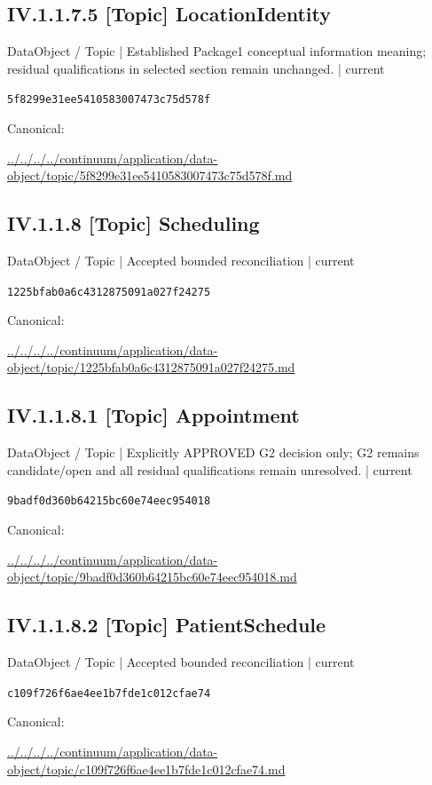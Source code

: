 \documentclass[10pt,a4paper]{article}
\begin{document}
\subsection*{IV.1.1.7.5 [Topic] LocationIdentity}
\label{element-5f8299e31ee5410583007473c75d578f}
{\small DataObject / Topic | Established Package1 conceptual information meaning; residual qualifications in selected section remain unchanged. | current}\par
\texttt{5f8299e31ee5410583007473c75d578f}\par
Canonical: \par
{\footnotesize\url{../../../../continuum/application/data-object/topic/5f8299e31ee5410583007473c75d578f.md}}\par
\subsection*{IV.1.1.8 [Topic] Scheduling}
\label{element-1225bfab0a6c4312875091a027f24275}
{\small DataObject / Topic | Accepted bounded reconciliation | current}\par
\texttt{1225bfab0a6c4312875091a027f24275}\par
Canonical: \par
{\footnotesize\url{../../../../continuum/application/data-object/topic/1225bfab0a6c4312875091a027f24275.md}}\par
\subsection*{IV.1.1.8.1 [Topic] Appointment}
\label{element-9badf0d360b64215bc60e74eec954018}
{\small DataObject / Topic | Explicitly APPROVED G2 decision only; G2 remains candidate/open and all residual qualifications remain unresolved. | current}\par
\texttt{9badf0d360b64215bc60e74eec954018}\par
Canonical: \par
{\footnotesize\url{../../../../continuum/application/data-object/topic/9badf0d360b64215bc60e74eec954018.md}}\par
\subsection*{IV.1.1.8.2 [Topic] PatientSchedule}
\label{element-c109f726f6ae4ee1b7fde1c012cfae74}
{\small DataObject / Topic | Accepted bounded reconciliation | current}\par
\texttt{c109f726f6ae4ee1b7fde1c012cfae74}\par
Canonical: \par
{\footnotesize\url{../../../../continuum/application/data-object/topic/c109f726f6ae4ee1b7fde1c012cfae74.md}}\par
\end{document}
